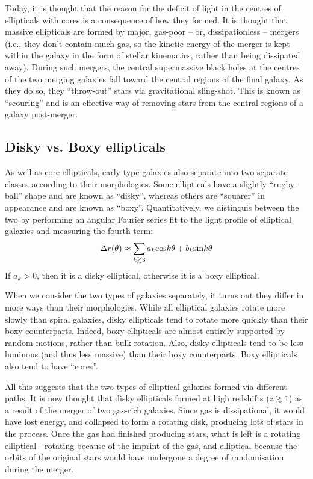 \documentclass[11pt]{article}
\begin{document}
Today, it is thought that the reason for the deficit of light in the
centres of ellipticals with cores is a consequence of how they
formed. It is thought that massive ellipticals are formed by major,
gas-poor -- or, dissipationless -- mergers (i.e., they don't contain
much gas, so the kinetic energy of the merger is kept within the
galaxy in the form of stellar kinematics, rather than being dissipated
away). During such mergers, the central supermassive black holes at
the centres of the two merging galaxies fall toward the central
regions of the final galaxy. As they do so, they ``throw-out'' stars
via gravitational sling-shot. This is known as ``scouring'' and is an
effective way of removing stars from the central regions of a galaxy
post-merger.

\subsection{Disky vs. Boxy ellipticals}
As well as core ellipticals, early type galaxies also separate into
two separate classes according to their morphologies. Some ellipticals
have a slightly ``rugby-ball'' shape and are known as ``disky'',
whereas others are ``squarer'' in appearance and are known as
``boxy''. Quantitatively, we distinguis between the two by performing
an angular Fourier series fit to the light profile of elliptical
galaxies and measuring the fourth term:
\begin{equation}
\Delta r(\theta)\approx\sum_{k\gtrsim3}a_k{\rm cos}k\theta + b_k{\rm sin}k\theta
\end{equation}
If $a_k>0$, then it is a disky elliptical, otherwise it is a boxy elliptical.

When we consider the two types of galaxies separately, it turns out
they differ in more ways than their morphologies. While all elliptical
galaxies rotate more slowly than spiral galaxies, disky ellipticals
tend to rotate more quickly than their boxy counterparts. Indeed, boxy
ellipticals are almost entirely supported by random motions, rather
than bulk rotation. Also, disky ellipticals tend to be less luminous
(and thus less massive) than their boxy counterparts. Boxy ellipticals
also tend to have ``cores''.

All this suggests that the two types of elliptical galaxies formed via
different paths. It is now thought that disky ellipticals formed at
high redshifts ($z\gtrsim1$) as a result of the merger of two gas-rich
galaxies. Since gas is dissipational, it would have lost energy, and
collapsed to form a rotating disk, producing lots of stars in the
process. Once the gas had finished producing stars, what is left is a
rotating elliptical - rotating because of the imprint of the gas, and
elliptical because the orbits of the original stars would have
undergone a degree of randomisation during the merger.
\end{document}
